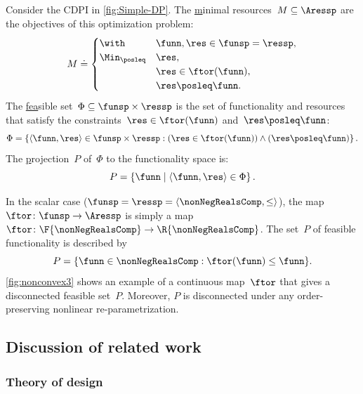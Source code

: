 \begin{example}
\label{exa:one}Consider the CDPI in \cref{fig:Simple-DP}. The \uline{m}inimal
resources~$M\subseteq\Aressp$ are the objectives of this optimization
problem:
\[
M\doteq\begin{cases}
\with & \funn,\res\in\funsp=\ressp,\\
\Min_{\posleq} & \res,\\
 & \res\in\ftor(\funn),\\
 & \res\posleq\funn.
\end{cases}
\]
The \uline{fea}sible set~$\Phi\subseteq\funsp\times\ressp$ is
the set of functionality and resources that satisfy the constraints~$\res\in\ftor(\funn)$
and~$\res\posleq\funn$:
\begin{equation}
\Phi=\left\{ \langle\funn,\res\rangle\in\funsp\times\ressp:(\res\in\ftor(\funn))\wedge(\res\posleq\funn)\right\} .\label{eq:feasible}
\end{equation}
The \uline{p}rojection~$P$ of~$\Phi$ to the functionality space
is:
\[
P=\left\{ \funn\mid\left\langle \funn,\res\right\rangle \in\Phi\right\} .
\]

In the scalar case ($\funsp=\ressp=\langle\nonNegRealsComp,\leq\rangle$),
the map~$\ftor\colon\funsp\rightarrow\Aressp$ is simply a map~$\ftor\colon\F{\nonNegRealsComp}\rightarrow\R{\nonNegRealsComp}$.
The set~$P$ of feasible functionality is described by
\begin{equation}
P=\{\funn\in\nonNegRealsComp:\ftor(\funn)\leq\funn\}.\label{eq:Pfeasible}
\end{equation}
\cref{fig:nonconvex3} shows an example of a continuous map~$\ftor$
that gives a disconnected feasible set~$P$. Moreover, $P$ is disconnected
under any order-preserving nonlinear re-parametrization.

\end{example}




\subsection{Discussion of related work\label{sec:Discussion-of-related}}

\subsubsection{Theory of design}


